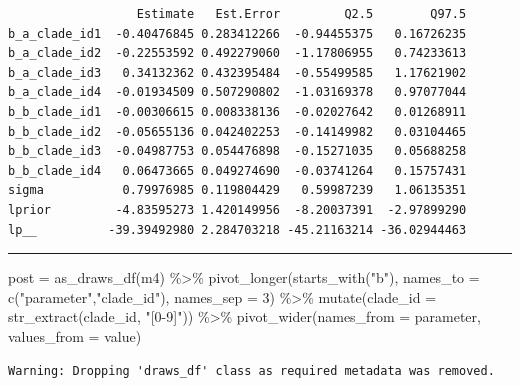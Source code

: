 \documentclass[
  letterpaper,
  DIV=11,
  numbers=noendperiod]{scrartcl}
\newenvironment{Shaded}{\begin{snugshade}}{\end{snugshade}}
\newcommand{\AttributeTok}[1]{\textcolor[rgb]{0.40,0.45,0.13}{#1}}
\newcommand{\DecValTok}[1]{\textcolor[rgb]{0.68,0.00,0.00}{#1}}
\newcommand{\FunctionTok}[1]{\textcolor[rgb]{0.28,0.35,0.67}{#1}}
\newcommand{\NormalTok}[1]{\textcolor[rgb]{0.00,0.23,0.31}{#1}}
\newcommand{\OtherTok}[1]{\textcolor[rgb]{0.00,0.23,0.31}{#1}}
\newcommand{\SpecialCharTok}[1]{\textcolor[rgb]{0.37,0.37,0.37}{#1}}
\newcommand{\StringTok}[1]{\textcolor[rgb]{0.13,0.47,0.30}{#1}}
\begin{document}
\begin{verbatim}
                  Estimate   Est.Error         Q2.5        Q97.5
b_a_clade_id1  -0.40476845 0.283412266  -0.94455375   0.16726235
b_a_clade_id2  -0.22553592 0.492279060  -1.17806955   0.74233613
b_a_clade_id3   0.34132362 0.432395484  -0.55499585   1.17621902
b_a_clade_id4  -0.01934509 0.507290802  -1.03169378   0.97077044
b_b_clade_id1  -0.00306615 0.008338136  -0.02027642   0.01268911
b_b_clade_id2  -0.05655136 0.042402253  -0.14149982   0.03104465
b_b_clade_id3  -0.04987753 0.054476898  -0.15271035   0.05688258
b_b_clade_id4   0.06473665 0.049274690  -0.03741264   0.15757431
sigma           0.79976985 0.119804429   0.59987239   1.06135351
lprior         -4.83595273 1.420149956  -8.20037391  -2.97899290
lp__          -39.39492980 2.284703218 -45.21163214 -36.02944463
\end{verbatim}

\begin{center}\rule{0.5\linewidth}{0.5pt}\end{center}

\begin{Shaded}
\begin{Highlighting}[]
\NormalTok{post }\OtherTok{=} \FunctionTok{as\_draws\_df}\NormalTok{(m4) }\SpecialCharTok{\%\textgreater{}\%} 
  \FunctionTok{pivot\_longer}\NormalTok{(}\FunctionTok{starts\_with}\NormalTok{(}\StringTok{"b"}\NormalTok{),}
               \AttributeTok{names\_to =} \FunctionTok{c}\NormalTok{(}\StringTok{"parameter"}\NormalTok{,}\StringTok{"clade\_id"}\NormalTok{),}
               \AttributeTok{names\_sep =} \DecValTok{3}\NormalTok{) }\SpecialCharTok{\%\textgreater{}\%} 
  \FunctionTok{mutate}\NormalTok{(}\AttributeTok{clade\_id =} \FunctionTok{str\_extract}\NormalTok{(clade\_id, }\StringTok{"[0{-}9]"}\NormalTok{)) }\SpecialCharTok{\%\textgreater{}\%} 
  \FunctionTok{pivot\_wider}\NormalTok{(}\AttributeTok{names\_from =}\NormalTok{ parameter, }\AttributeTok{values\_from =}\NormalTok{ value)}
\end{Highlighting}
\end{Shaded}

\begin{verbatim}
Warning: Dropping 'draws_df' class as required metadata was removed.
\end{verbatim}
\end{document}
